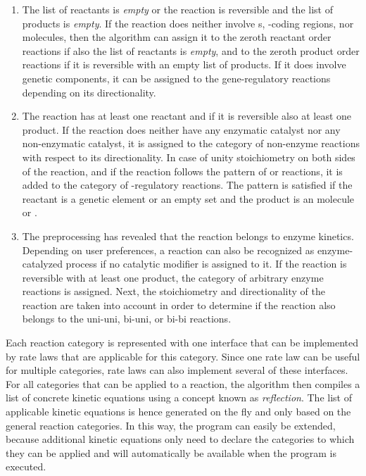 \begin{enumerate}
  \item The list of reactants is \emph{empty} or the reaction is reversible and the list of products is \emph{empty}.
If the reaction does neither involve {\gene}s, {\gene}-coding regions, nor \RNA molecules, then the algorithm can assign it to the  zeroth reactant order reactions if also the list of reactants is \emph{empty}, and to the zeroth product order reactions if it is reversible with an empty list of products.
If it does involve genetic components, it can be assigned to the gene-regulatory reactions depending on its directionality.

  \item The reaction has at least one reactant and if it is reversible also at least one product.
If the reaction does neither have any enzymatic catalyst nor any non-enzymatic catalyst, it is assigned to the category of non-enzyme reactions with respect to its directionality.
In case of unity stoichiometry on both sides of the reaction, and if the reaction follows the pattern of \transcription or \translation reactions, it is added to the category of {\gene}-regulatory reactions.
The pattern is satisfied if the reactant is a genetic element or an empty set and the product is an \RNA molecule or \protein.

  \item The preprocessing has revealed that the reaction belongs to enzyme kinetics.
Depending on user preferences, a reaction can also be recognized as enzyme-catalyzed process if no catalytic modifier is assigned to it.
If the reaction is reversible with at least one product, the category of arbitrary enzyme reactions is assigned.
Next, the stoichiometry and directionality of the reaction are taken into account in order to determine if the reaction also belongs to the uni-uni, bi-uni, or bi-bi reactions.
\end{enumerate}

Each reaction category is represented with one interface that can be implemented by rate laws that are applicable for this category.
Since one rate law can be useful for multiple categories, rate laws can also implement several of these interfaces.
For all categories that can be applied to a reaction, the algorithm then compiles a list of concrete kinetic equations using a concept known as \emph{reflection}.
The list of applicable kinetic equations is hence generated on the fly and only based on the general reaction categories.
In this way, the program can easily be extended, because additional kinetic equations only need to declare the categories to which they can be applied and will automatically be available when the program is executed.

